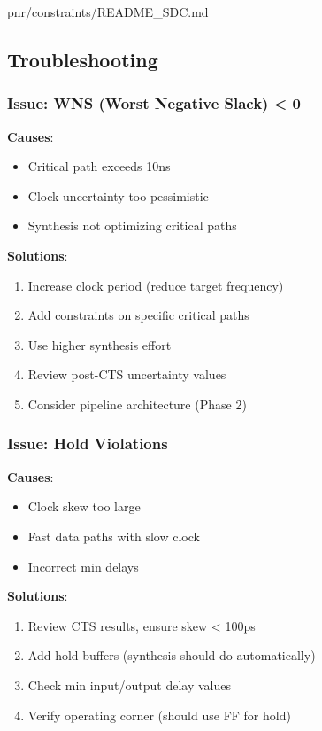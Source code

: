 \begin{relocated}{pnr/constraints/README_SDC.md}
\subsection{Troubleshooting}\label{tm:pd:constraints-readme-sdc:troubleshooting}

\subsubsection{Issue: WNS (Worst Negative Slack) \textless{} 0}\label{tm:pd:constraints-readme-sdc:issue-wns-worst-negative-slack-0}

\textbf{Causes}:

\begin{itemize}
\tightlist
\item
  Critical path exceeds 10ns
\item
  Clock uncertainty too pessimistic
\item
  Synthesis not optimizing critical paths
\end{itemize}

\textbf{Solutions}:

\begin{enumerate}
\def\labelenumi{\arabic{enumi}.}
\tightlist
\item
  Increase clock period (reduce target frequency)
\item
  Add  constraints on specific critical paths
\item
  Use higher synthesis effort
\item
  Review post-CTS uncertainty values
\item
  Consider pipeline architecture (Phase 2)
\end{enumerate}

\subsubsection{Issue: Hold Violations}\label{tm:pd:constraints-readme-sdc:issue-hold-violations}

\textbf{Causes}:

\begin{itemize}
\tightlist
\item
  Clock skew too large
\item
  Fast data paths with slow clock
\item
  Incorrect min delays
\end{itemize}

\textbf{Solutions}:

\begin{enumerate}
\def\labelenumi{\arabic{enumi}.}
\tightlist
\item
  Review CTS results, ensure skew \textless{} 100ps
\item
  Add hold buffers (synthesis should do automatically)
\item
  Check min input/\allowbreak{}output delay values
\item
  Verify operating corner (should use FF for hold)
\end{enumerate}


\end{relocated}
